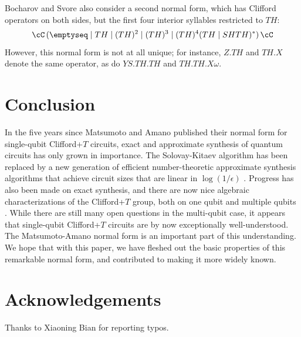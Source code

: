 \documentclass{article}
\begin{document}
Bocharov and Svore {\cite[Prop.2]{BS}} also consider a second normal
form, which has Clifford operators on both sides, but the first four
interior syllables restricted to $TH$:
\begin{equation}
  \cC\,(\emptyseq\mid TH\mid (TH)^2 \mid (TH)^3 \mid (TH)^4(TH\mid SHTH)^*)\,\cC
\end{equation}
However, this normal form is not at all unique; for instance,
$Z.TH$ and $TH.X$ denote the same operator, as do $YS.TH.TH$ and
$TH.TH.X\omega$.

\section{Conclusion}

In the five years since Matsumoto and Amano published their normal
form for single-qubit Clifford+$T$ circuits, exact and approximate
synthesis of quantum circuits has only grown in importance. The
Solovay-Kitaev algorithm has been replaced by a new generation of
efficient number-theoretic approximate synthesis algorithms that
achieve circuit sizes that are linear in $\log(1/\epsilon)$
{\cite{KMM-approx,Selinger-newsynth,KMM-practical,KBS13}}. Progress
has also been made on exact synthesis, and there are now nice
algebraic characterizations of the Clifford+$T$ group, both on one
qubit {\cite{Kliuchnikov-etal}} and multiple qubits
{\cite{Giles-Selinger}}. While there are still many open questions in
the multi-qubit case, it appears that single-qubit Clifford+$T$
circuits are by now exceptionally well-understood. The Matsumoto-Amano
normal form is an important part of this understanding. We hope that
with this paper, we have fleshed out the basic properties of this
remarkable normal form, and contributed to making it more widely
known.

\section{Acknowledgements}

Thanks to Xiaoning Bian for reporting typos.




\end{document}
